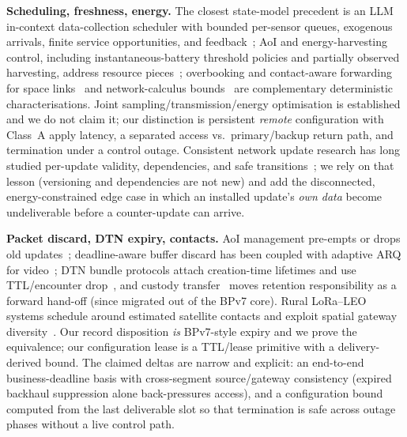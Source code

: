 \documentclass[11pt]{article}
\begin{document}
\textbf{Scheduling, freshness, energy.} The closest state-model precedent is an LLM in-context
data-collection scheduler with bounded per-sensor queues, exogenous arrivals, finite service
opportunities, and feedback~\cite{icldc}; AoI and energy-harvesting control, including
instantaneous-battery threshold policies and partially observed harvesting, address resource
pieces~\cite{bacinoglu1905,zakeri2311,costa2014pm}; overbooking and contact-aware forwarding for
space links~\cite{ccsdssabr} and network-calculus bounds~\cite{leboudec01} are complementary
deterministic characterisations. Joint sampling/transmission/energy optimisation is established
and we do not claim it; our distinction is persistent \emph{remote} configuration with Class~A
apply latency, a separated access vs.\ primary/backup return path, and termination under a control
outage. Consistent network update research has long studied per-update validity, dependencies,
and safe transitions~\cite{sdnconsistency}; we rely on that lesson (versioning and dependencies
are not new) and add the disconnected, energy-constrained edge case in which an installed update's
\emph{own data} become undeliverable before a counter-update can arrive.

\textbf{Packet discard, DTN expiry, contacts.} AoI management pre-empts or drops old
updates~\cite{kam2016deadline,krishnan2019multihop}; deadline-aware buffer discard has been
coupled with adaptive ARQ for video~\cite{razavivideo}; DTN bundle protocols attach creation-time
lifetimes and use TTL/encounter drop~\cite{dtnarch,iranmaneshdtnqueue,rfc9171}, and custody
transfer~\cite{rfc5050} moves retention responsibility as a forward hand-off (since migrated out
of the BPv7 core). Rural LoRa--LEO systems schedule around estimated satellite contacts and
exploit spatial gateway diversity~\cite{sateriot}. Our record disposition \emph{is} BPv7-style
expiry and we prove the equivalence; our configuration lease is a TTL/lease primitive with a
delivery-derived bound. The claimed deltas are narrow and explicit: an end-to-end business-deadline
basis with cross-segment source/gateway consistency (expired backhaul suppression alone
back-pressures access), and a configuration bound computed from the last deliverable slot so that
termination is safe across outage phases without a live control path.
\end{document}
